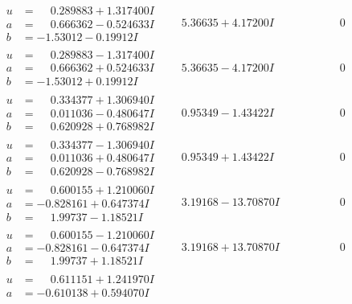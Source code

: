 \documentclass[1p]{elsarticle_modified}
\theoremstyle{definition}
\begin{document}
$$\begin{array}{c|c|c}
\begin{aligned}
u &= \phantom{-}0.289883 + 1.317400 I \\
a &= \phantom{-}0.666362 - 0.524633 I \\
b &= -1.53012 - 0.19912 I\end{aligned}
 & \phantom{-}5.36635 + 4.17200 I & \phantom{-0.000000 } 0 \\ \hline\begin{aligned}
u &= \phantom{-}0.289883 - 1.317400 I \\
a &= \phantom{-}0.666362 + 0.524633 I \\
b &= -1.53012 + 0.19912 I\end{aligned}
 & \phantom{-}5.36635 - 4.17200 I & \phantom{-0.000000 } 0 \\ \hline\begin{aligned}
u &= \phantom{-}0.334377 + 1.306940 I \\
a &= \phantom{-}0.011036 - 0.480647 I \\
b &= \phantom{-}0.620928 + 0.768982 I\end{aligned}
 & \phantom{-}0.95349 - 1.43422 I & \phantom{-0.000000 } 0 \\ \hline\begin{aligned}
u &= \phantom{-}0.334377 - 1.306940 I \\
a &= \phantom{-}0.011036 + 0.480647 I \\
b &= \phantom{-}0.620928 - 0.768982 I\end{aligned}
 & \phantom{-}0.95349 + 1.43422 I & \phantom{-0.000000 } 0 \\ \hline\begin{aligned}
u &= \phantom{-}0.600155 + 1.210060 I \\
a &= -0.828161 + 0.647374 I \\
b &= \phantom{-}1.99737 - 1.18521 I\end{aligned}
 & \phantom{-}3.19168 - 13.70870 I & \phantom{-0.000000 } 0 \\ \hline\begin{aligned}
u &= \phantom{-}0.600155 - 1.210060 I \\
a &= -0.828161 - 0.647374 I \\
b &= \phantom{-}1.99737 + 1.18521 I\end{aligned}
 & \phantom{-}3.19168 + 13.70870 I & \phantom{-0.000000 } 0 \\ \hline\begin{aligned}
u &= \phantom{-}0.611151 + 1.241970 I \\
a &= -0.610138 + 0.594070 I \\

\end{aligned}
\end{array}$$
\end{document}
